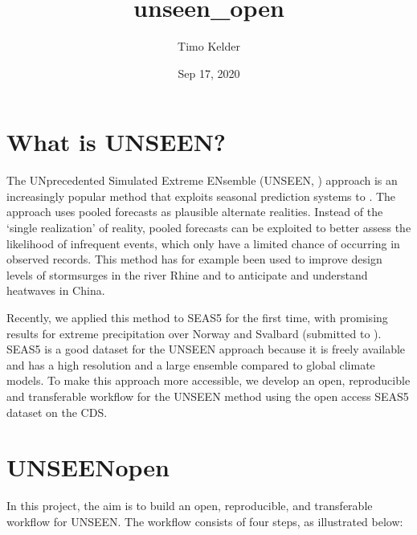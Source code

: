 \documentclass[letterpaper,10pt,english]{sphinxmanual}
\title{unseen\_open}
\date{Sep 17, 2020}
\author{Timo Kelder}
\begin{document}
\pagestyle{empty}
\sphinxmaketitle
\pagestyle{plain}
\sphinxtableofcontents
\pagestyle{normal}
\label{\detokenize{index::doc}}



\chapter{What is UNSEEN?}
\label{\detokenize{Whats-unseen:What-is-UNSEEN?}}\label{\detokenize{Whats-unseen::doc}}
The UNprecedented Simulated Extreme ENsemble (UNSEEN, ) approach is an increasingly popular method that exploits seasonal prediction systems to . The approach uses pooled forecasts as plausible alternate realities. Instead of the ‘single realization’ of reality, pooled forecasts can be exploited to better assess the likelihood of infrequent events,
which only have a limited chance of occurring in observed records. This method has for example been used to improve design levels of storm\sphinxhyphen{}surges in the river Rhine and to anticipate and understand heatwaves in China.

Recently, we applied this method to SEAS5 for the first time, with promising results for extreme precipitation over Norway and Svalbard (submitted to ). SEAS5 is a good dataset for the UNSEEN approach because it is freely available and has a high resolution and a large ensemble compared to global climate models. To make this approach more accessible, we develop an open, reproducible and transferable workflow for the
UNSEEN method using the open access SEAS5 dataset on the CDS.

{
\begin{sphinxVerbatim}[commandchars=\\\{\}]
\llap{\color{nbsphinxin}[ ]:\,\hspace{\fboxrule}\hspace{\fboxsep}}
\end{sphinxVerbatim}
}


\chapter{UNSEEN\sphinxhyphen{}open}
\label{\detokenize{Notebooks/Workflow:UNSEEN-open}}\label{\detokenize{Notebooks/Workflow::doc}}
In this project, the aim is to build an open, reproducible, and transferable workflow for UNSEEN. The workflow consists of four steps, as illustrated below:
\end{document}
